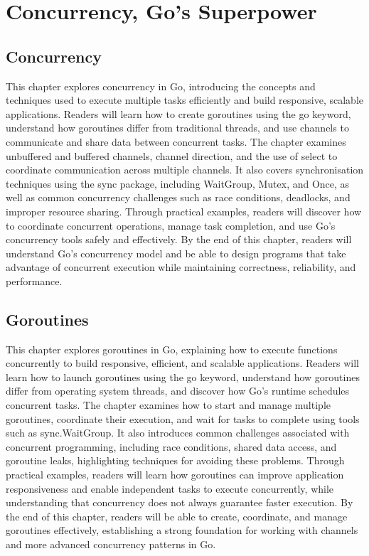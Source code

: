 \documentclass[12pt,oneside]{book}
\begin{document}
\part{Concurrency, Go's Superpower}

\chapter{Concurrency}
\begin{chaptersummary}
This chapter explores concurrency in Go, introducing the concepts and techniques used to execute multiple tasks efficiently and build responsive, scalable applications. Readers will learn how to create goroutines using the go keyword, understand how goroutines differ from traditional threads, and use channels to communicate and share data between concurrent tasks. The chapter examines unbuffered and buffered channels, channel direction, and the use of select to coordinate communication across multiple channels. It also covers synchronisation techniques using the sync package, including WaitGroup, Mutex, and Once, as well as common concurrency challenges such as race conditions, deadlocks, and improper resource sharing. Through practical examples, readers will discover how to coordinate concurrent operations, manage task completion, and use Go’s concurrency tools safely and effectively. By the end of this chapter, readers will understand Go’s concurrency model and be able to design programs that take advantage of concurrent execution while maintaining correctness, reliability, and performance.
\end{chaptersummary}


\chapter{Goroutines}
\begin{chaptersummary}
This chapter explores goroutines in Go, explaining how to execute functions concurrently to build responsive, efficient, and scalable applications. Readers will learn how to launch goroutines using the go keyword, understand how goroutines differ from operating system threads, and discover how Go’s runtime schedules concurrent tasks. The chapter examines how to start and manage multiple goroutines, coordinate their execution, and wait for tasks to complete using tools such as sync.WaitGroup. It also introduces common challenges associated with concurrent programming, including race conditions, shared data access, and goroutine leaks, highlighting techniques for avoiding these problems. Through practical examples, readers will learn how goroutines can improve application responsiveness and enable independent tasks to execute concurrently, while understanding that concurrency does not always guarantee faster execution. By the end of this chapter, readers will be able to create, coordinate, and manage goroutines effectively, establishing a strong foundation for working with channels and more advanced concurrency patterns in Go.
\end{chaptersummary}

\end{document}
